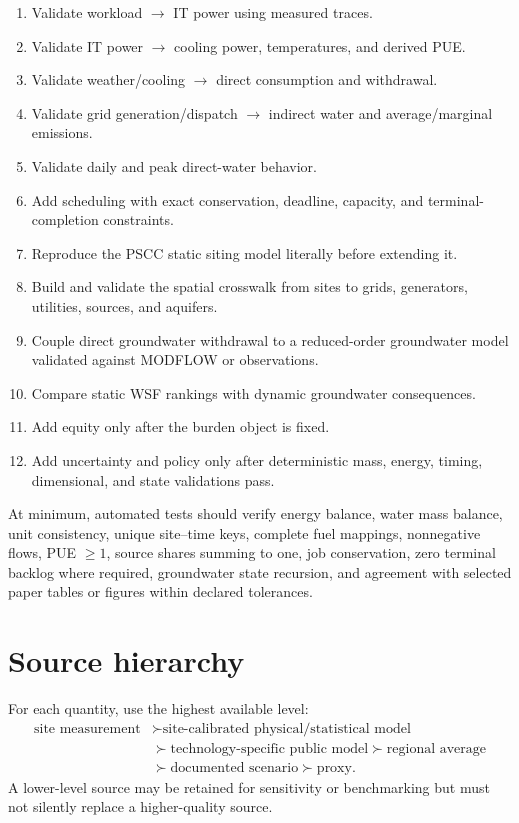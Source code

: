 \documentclass[10pt]{article}
\begin{document}
\begin{enumerate}
\item Validate workload $\rightarrow$ IT power using measured traces.
\item Validate IT power $\rightarrow$ cooling power, temperatures, and derived PUE.
\item Validate weather/cooling $\rightarrow$ direct consumption and withdrawal.
\item Validate grid generation/dispatch $\rightarrow$ indirect water and average/marginal emissions.
\item Validate daily and peak direct-water behavior.
\item Add scheduling with exact conservation, deadline, capacity, and terminal-completion constraints.
\item Reproduce the PSCC static siting model literally before extending it.
\item Build and validate the spatial crosswalk from sites to grids, generators, utilities, sources, and aquifers.
\item Couple direct groundwater withdrawal to a reduced-order groundwater model validated against MODFLOW or observations.
\item Compare static WSF rankings with dynamic groundwater consequences.
\item Add equity only after the burden object is fixed.
\item Add uncertainty and policy only after deterministic mass, energy, timing, dimensional, and state validations pass.
\end{enumerate}

At minimum, automated tests should verify energy balance, water mass balance, unit consistency, unique site--time keys, complete fuel mappings, nonnegative flows, PUE $\ge1$, source shares summing to one, job conservation, zero terminal backlog where required, groundwater state recursion, and agreement with selected paper tables or figures within declared tolerances.

\section{Source hierarchy}

For each quantity, use the highest available level:
\[
\begin{aligned}
\text{site measurement}
&\succ \text{site-calibrated physical/statistical model}\\
&\succ \text{technology-specific public model}
\succ \text{regional average}\\
&\succ \text{documented scenario}
\succ \text{proxy}.
\end{aligned}
\]
A lower-level source may be retained for sensitivity or benchmarking but must not silently replace a higher-quality source.
\end{document}

